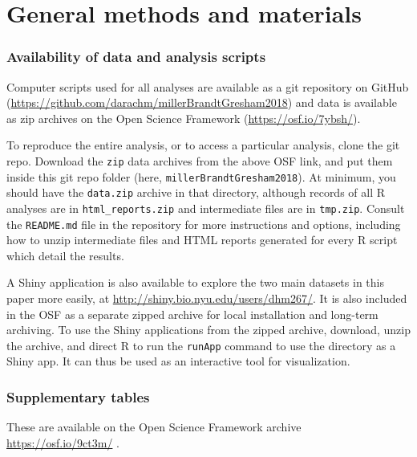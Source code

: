 \section{General methods and materials}

\subsubsection{Availability of data and analysis scripts}

\label{subsubsection:codeanddata}

Computer scripts used for all analyses are available as a git repository
on GitHub\\
(\url{https://github.com/darachm/millerBrandtGresham2018})
and data is available as zip archives on the Open Science
Framework (\url{https://osf.io/7ybsh/}).

To reproduce the entire analysis, or to access a particular 
analysis, clone the git repo.  
Download the \texttt{zip} data archives from the above
OSF link, and put them inside this git repo folder 
(here, \texttt{millerBrandtGresham2018}).
At minimum, you should have the \texttt{data.zip} archive in that directory,
although records of all R analyses are in \texttt{html\_reports.zip}
and intermediate files are in \texttt{tmp.zip}.
Consult the \texttt{README.md} file in the repository for more instructions
and options, including how to unzip intermediate files and HTML
reports generated for every R script which detail the results.

A Shiny application is also available to explore the two main 
datasets in this paper more easily, at
\url{http://shiny.bio.nyu.edu/users/dhm267/}. It
is also included in the OSF as a separate zipped archive for local
installation and long-term archiving. 
To use the Shiny applications from the zipped archive, download,
unzip the archive, and direct R to run the \texttt{runApp} command
to use the directory as a Shiny app. It can thus be used as an
interactive tool for visualization.

\subsubsection{Supplementary tables}

These are available on the Open Science Framework archive
\url{https://osf.io/9ct3m/} .

